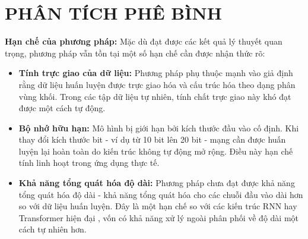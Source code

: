 \chapter{PHÂN TÍCH PHÊ BÌNH}

\noindent\textbf{Hạn chế của phương pháp:} Mặc dù đạt được các kết quả lý thuyết quan trọng, phương pháp vẫn tồn tại một số hạn chế cần được nhận thức rõ:

\begin{itemize}
    \item \textbf{Tính trực giao của dữ liệu:} Phương pháp phụ thuộc mạnh vào giả định rằng dữ liệu huấn luyện được trực giao hóa và cấu trúc hóa theo dạng phân vùng khối. Trong các tập dữ liệu tự nhiên, tính chất trực giao này khó đạt được một cách tự động.
    
    \item \textbf{Bộ nhớ hữu hạn:} Mô hình bị giới hạn bởi kích thước đầu vào cố định. Khi thay đổi kích thước bit - ví dụ từ 10 bit lên 20 bit - mạng cần được huấn luyện lại hoàn toàn do kiến trúc không tự động mở rộng. Điều này hạn chế tính linh hoạt trong ứng dụng thực tế.
    
    \item \textbf{Khả năng tổng quát hóa độ dài:} Phương pháp chưa đạt được khả năng tổng quát hóa độ dài - khả năng tổng quát hóa cho các chuỗi đầu vào dài hơn so với dữ liệu huấn luyện. Đây là một hạn chế so với các kiến trúc RNN hay Transformer hiện đại \cite{vaswani_2017}, vốn có khả năng xử lý ngoài phân phối về độ dài một cách tự nhiên hơn.
\end{itemize}
